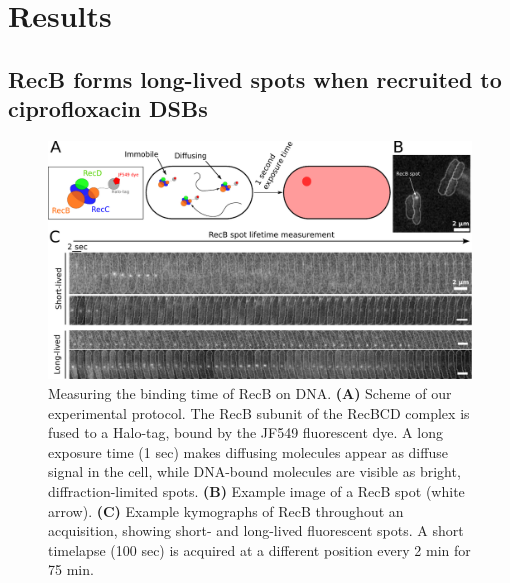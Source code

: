 \section*{Results}

\subsection*{RecB forms long-lived spots when recruited to cipro\-floxacin DSBs}

\begin{figure}[htbp]
    \centering
    \includegraphics[width=.8\textwidth]{Figures/Fig1_Exp_principle.pdf}
    \caption{Measuring the binding time of RecB on DNA. \textbf{(A)} Scheme of our experimental protocol. The RecB subunit of the RecBCD complex is fused to a Halo-tag, bound by the JF549 fluorescent dye\cite{Lepore2019a, Lepore2023}. A long exposure time (1 sec) makes diffusing molecules appear as diffuse signal in the cell, while DNA-bound molecules are visible as bright, diffraction-limited spots. \textbf{(B)} Example image of a RecB spot (white arrow). \textbf{(C)} Example kymographs of RecB throughout an acquisition, showing short- and long-lived fluorescent spots. A short timelapse (100 sec) is acquired at a different position every 2 min for 75 min.}
    \label{Fig:exp_principle}
\end{figure}

